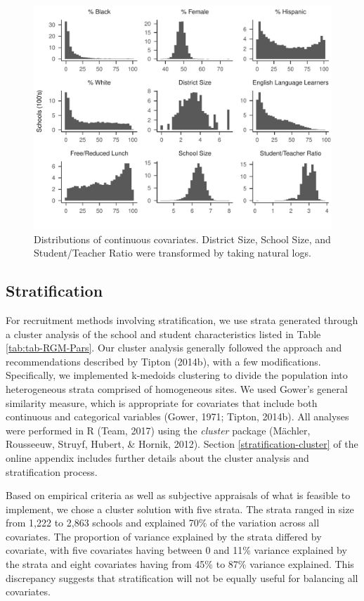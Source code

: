 \documentclass[
  english,
  man,floatsintext]{apa6}
\begin{document}
\begin{figure}
\centering
\includegraphics{6---Paper_files/figure-latex/fig-dist1-1.pdf}
\caption{\label{fig:fig-dist1}Distributions of continuous covariates. District Size, School Size, and Student/Teacher Ratio were transformed by taking natural logs.}
\end{figure}

\hypertarget{stratification}{%
\subsection*{Stratification}\label{stratification}}

For recruitment methods involving stratification, we use strata generated through a cluster analysis of the school and student characteristics listed in Table \ref{tab:tab-RGM-Pars}.
Our cluster analysis generally followed the approach and recommendations described by Tipton (2014b), with a few modifications. Specifically, we implemented k-medoids clustering to divide the population into heterogeneous strata comprised of homogeneous sites. We used Gower's general similarity measure, which is appropriate for covariates that include both continuous and categorical variables (Gower, 1971; Tipton, 2014b).
All analyses were performed in R (Team, 2017) using the \emph{cluster} package (Mächler, Rousseeuw, Struyf, Hubert, \& Hornik, 2012).
Section \ref{stratification-cluster} of the online appendix includes further details about the cluster analysis and stratification process.

Based on empirical criteria as well as subjective appraisals of what is feasible to implement, we chose a cluster solution with five strata.
The strata ranged in size from 1,222 to 2,863 schools and explained 70\% of the variation across all covariates. The proportion of variance explained by the strata differed by covariate, with five covariates having between 0 and 11\% variance explained by the strata and eight covariates having from 45\% to 87\% variance explained. This discrepancy suggests that stratification will not be equally useful for balancing all covariates.
\end{document}
